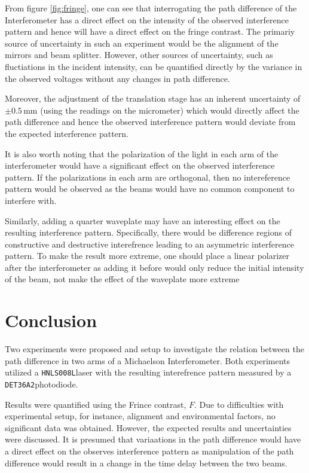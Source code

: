 \documentclass[aip, cp, amsmath, amssymb, reprint]{revtex4-2}
\newcommand{\pdiode}{\texttt{DET36A2}\space}
\newcommand{\hene}{\texttt{HNLS008L}\space}
\begin{document}
        From figure \ref{fig:fringe}, one can see that interrogating the path difference of the Interferometer has a direct effect on the intensity of the observed interference pattern and hence will have a direct effect on the fringe contrast. The primariy source of uncertainty in such an experiment would be the alignment of the mirrors and beam splitter. However, other sources of uncertainty, such as fluctiations in the incident intensity, can be quantified directly by the variance in the observed voltages without any changes in path difference.

        Moreover, the adjustment of the translation stage has an inherent uncertainty of $\pm 0.5\,\text{mm}$ (using the readings on the micrometer) which would directly affect the path difference and hence the observed interference pattern would deviate from the expected interference pattern.

        It is also worth noting that the polarization of the light in each arm of the interferometer would have a significant effect on the observed interference pattern. If the polarizations in each arm are orthogonal, then no intereference pattern would be observed as the beams would have no common component to interfere with.

        Similarly, adding a quarter waveplate may have an interesting effect on the resulting interference pattern. Specifically, there would be difference regions of constructive and destructive interefrence leading to an asymmetric interference pattern. To make the result more extreme, one should place a linear polarizer after the interferometer as adding it before would only reduce the initial intensity of the beam, not make the effect of the waveplate more extreme
    
    \section{Conclusion}
        Two experiments were proposed and setup to investigate the relation between the path difference in two arms of a Michaelson Interferometer. Both experiments utilized a \hene laser with the resulting interefrence pattern measured by a \pdiode photodiode. 

        Results were quantified using the Frince contrast, $F$. Due to difficulties with experimental setup, for instance, alignment and environmental factors, no significant data was obtained. However, the expected results and uncertainties were discussed. It is presumed that variaations in the path difference would have a direct effect on the observes interference pattern as manipulation of the path difference would result in a change in the time delay between the two beams.
\end{document}
